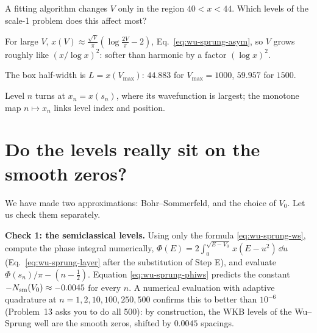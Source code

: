 \begin{checkpoint}
A fitting algorithm changes $V$ only in the region $40<x<44$. Which levels of the scale-1 problem does this affect most?
\end{checkpoint}

\begin{keyideas}
\item For large $V$, $x(V)\approx\frac{\sqrt V}{\pi}(\log\frac{2V}{\pi}-2)$, Eq.~\eqref{eq:wu-sprung-asym}, so $V$ grows roughly like $(x/\log x)^2$: softer than harmonic by a factor $(\log x)^2$.
\item The box half-width is $L=x(V_{\max})$: $44.883$ for $V_{\max}=1000$, $59.957$ for $1500$.
\item Level $n$ turns at $x_n=x(s_n)$, where its wavefunction is largest; the monotone map $n\mapsto x_n$ links level index and position.
\end{keyideas}

\section{Do the levels really sit on the smooth zeros?}\label{sec:wu-sprung-check}

We have made two approximations: Bohr--Sommerfeld, and the choice of $V_0$. Let us check them separately.

\textbf{Check 1: the semiclassical levels.} Using only the formula \eqref{eq:wu-sprung-ws}, compute the phase integral numerically, $\Phi(E)=2\int_0^{\sqrt{E-V_0}}x(E-u^2)\,\dd u$ (Eq.~\eqref{eq:wu-sprung-layer} after the substitution of Step E), and evaluate $\Phi(s_n)/\pi-(n-\tfrac12)$. Equation \eqref{eq:wu-sprung-phiws} predicts the constant $-N_{\mathrm{sm}}(V_0)\approx-0.0045$ for every $n$. A numerical evaluation with adaptive quadrature at $n=1,2,10,100,250,500$ confirms this to better than $10^{-6}$ (Problem~13 asks you to do all 500): by construction, the WKB levels of the Wu--Sprung well are the smooth zeros, shifted by $0.0045$ spacings.

